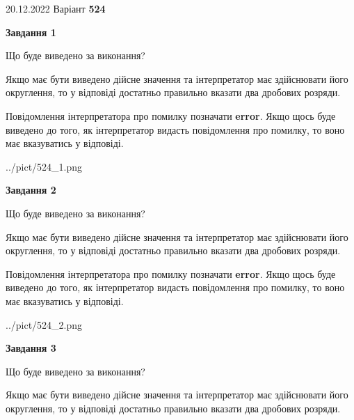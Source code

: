\documentclass[12pt, ukrainian]{article}
\begin{document}
{20.12.2022 Варіант \No \textbf { 524 }\par}
{
\begin {Large}

{\begin {center}\textbf{Завдання 1}\end {center}}\par
Що буде виведено за виконання? \par

Якщо має бути виведено дійсне значення та інтерпретатор має здійснювати його округлення, 
то у відповіді достатньо правильно вказати два дробових розряди.

Повідомлення інтерпретатора про помилку позначати \textbf{error}.
Якщо щось буде виведено до того, як інтерпретатор видасть повідомлення про помилку, 
то воно має вказуватись у відповіді. \par

\begin{center}
	{../pict/524_1.png}
\end{center}
\newpage

{\begin {center}\textbf{Завдання 2}\end {center}}\par
Що буде виведено за виконання? \par

Якщо має бути виведено дійсне значення та інтерпретатор має здійснювати його округлення, 
то у відповіді достатньо правильно вказати два дробових розряди.

Повідомлення інтерпретатора про помилку позначати \textbf{error}.
Якщо щось буде виведено до того, як інтерпретатор видасть повідомлення про помилку, 
то воно має вказуватись у відповіді. \par

\begin{center}
	{../pict/524_2.png}
\end{center}
\newpage

{\begin {center}\textbf{Завдання 3}\end {center}}\par
Що буде виведено за виконання? \par

Якщо має бути виведено дійсне значення та інтерпретатор має здійснювати його округлення, 
то у відповіді достатньо правильно вказати два дробових розряди.


\end{Large}}
\end{document}
